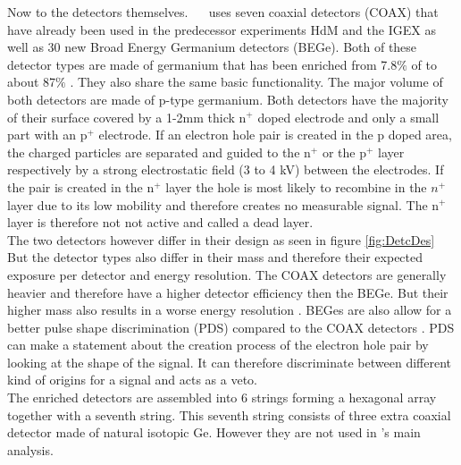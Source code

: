 \documentclass[encoding=utf8,british]{tumphthesis}
\begin{document}
Now to the detectors themselves.
\gerda\ \PII~ uses seven coaxial detectors (COAX) that have already been used in the predecessor experiments HdM and the IGEX as well as 30 new Broad Energy Germanium detectors (BEGe).
Both of these detector types are made of germanium that has been enriched from 7.8$\%$ of  to about 87$\%$ \cite{agostini_background_2017}.
They also share the same basic functionality.
The major volume of both detectors are made of p-type germanium.
Both detectors have the majority of their surface covered by a 1-2mm thick n$^+$ doped electrode and only a small part with an p$^+$ electrode.
If an electron hole pair is created in the p doped area, the charged particles are separated and guided to the n$^+$ or the p$^+$ layer respectively by a strong electrostatic field (3 to 4 kV) between the electrodes.
If the pair is created in the n$^+$ layer the hole is most likely to recombine in the $n^+$ layer due to its low mobility and therefore creates no measurable signal.
The n$^+$ layer is therefore not not active and called a dead layer.
\\

The two detectors however differ in their design as seen in figure \ref{fig:DetcDes}
But the detector types also differ in their mass and therefore their expected exposure per detector and energy resolution.
The COAX detectors are generally heavier and therefore have a higher detector efficiency then the BEGe.
But their higher mass also results in a worse energy resolution \cite{agostini_production_2015}.
BEGes are also allow for a better pulse shape discrimination (PDS) compared to the COAX detectors \cite{agostini_pulse_2013}.
PDS can make a statement about the creation process of the electron hole pair by looking at the shape of the signal.
It can therefore discriminate between different kind of origins for a signal and acts as a veto.
\\

The enriched detectors are assembled into 6 strings forming a hexagonal array together with a seventh string.
This seventh string consists of three extra coaxial detector made of natural isotopic Ge.
However they are not used in \gerda's main analysis.
\\
\end{document}
